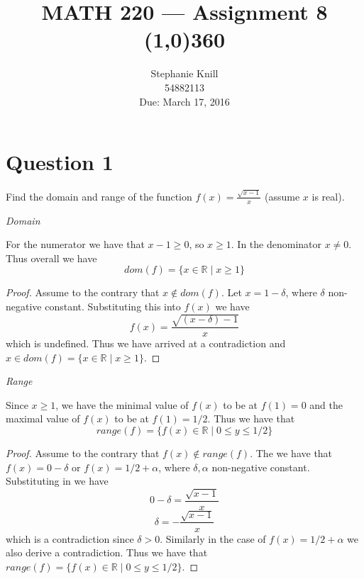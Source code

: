 \documentclass[11pt, oneside]{article}   	%
\begin{document}
\title{MATH 220 --- Assignment 8 \\
\line(1,0){360} \\              %
}
\author{
Stephanie Knill \\
54882113 \\
Due: March 17, 2016}

\date{}                   %
\maketitle




\section*{Question 1}

Find the domain and range of the function $f(x) = \frac{\sqrt{x-1}}{x}$ (assume $x$ is real).

\emph{Domain}

For the numerator we have that $x-1 \geq 0$, so $x\geq 1$. In the denominator $x \neq 0$. Thus overall we have
$$dom(f) = \{x \in \mathbb{R} \mid x \geq 1\}$$

\begin{proof}
Assume to the contrary that $x \notin dom(f)$. Let $x = 1 - \delta$, where $\delta$ non-negative constant. Substituting this into $f(x)$ we have
$$f(x) = \frac{\sqrt{(x-\delta)-1}}{x}$$
which is undefined. Thus we have arrived at a contradiction and $x \in dom(f)= \{x \in \mathbb{R} \mid x \geq 1\}$.
\end{proof}

\emph{Range}

Since $x \geq 1$, we have the minimal value of $f(x)$ to be at $f(1) = 0$ and the maximal value of $f(x)$ to be at $f(1) = 1/2$. Thus we have that
$$range(f) = \{f(x) \in \mathbb{R} \mid 0 \leq y \leq 1/2 \}$$

\begin{proof}
Assume to the contrary that $f(x) \notin range(f)$. The we have that $f(x) = 0 - \delta$ or $f(x) = 1/2 + \alpha$, where $\delta, \alpha$ non-negative constant. Substituting in we have
$$0 - \delta = \frac{\sqrt{x-1}}{x}$$
$$\delta = - \frac{\sqrt{x-1}}{x}$$
which is a contradiction since $\delta > 0$. Similarly in the case of $f(x) = 1/2 + \alpha$ we also derive a contradiction. Thus we have that $range(f) = \{f(x) \in \mathbb{R} \mid 0 \leq y \leq 1/2 \}$.
\end{proof}
\end{document}
